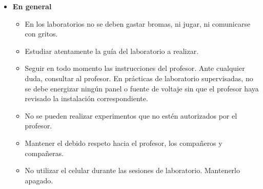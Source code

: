 \documentclass[12pt,letterpaper]{report}
\begin{document}
\begin{itemize}
\item \textbf{En general}
\begin{itemize}
\item En los laboratorios no se deben gastar bromas, ni jugar, ni comunicarse
con gritos.
\item Estudiar atentamente la guía del laboratorio a realizar.
\item Seguir en todo momento las instrucciones del profesor. Ante cualquier
duda, consultar al profesor.
En prácticas de laboratorio supervisadas, no se debe energizar ningún
panel o fuente de voltaje sin que el profesor haya revisado la instalación
correspondiente.
\item No se pueden realizar experimentos que no estén autorizados por el
profesor.
\item Mantener el debido respeto hacia el profesor, los compañeros y
compañeras.
\item No utilizar el celular durante las sesiones de laboratorio. Mantenerlo
apagado.
\end{itemize}


\end{itemize}
\end{document}
